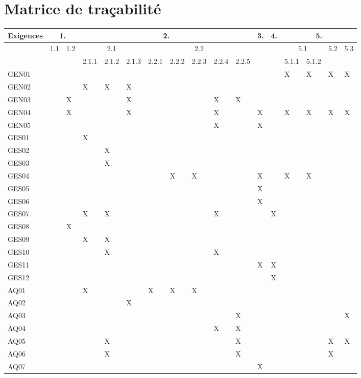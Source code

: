 \chapter{Matrice de traçabilité}
\begin{table}[H]
\hspace{-30px}
\begin{tabular}{|p{}|p{0.67cm}|p{0.67cm}|p{0.67cm}|p{0.67cm}|p{0.67cm}|p{0.67cm}|p{0.67cm}|p{0.67cm}|p{0.67cm}|p{0.67cm}|p{0.67cm}|p{0.67cm}|p{0.67cm}|p{0.67cm}|p{0.67cm}|p{0.67cm}|}
\hline
	Exigences & \multicolumn{2}{c|}{1.} & \multicolumn{8}{c|}{2.} & 3. & 4. & \multicolumn{4}{c|}{5.} \\ 
\hline
	& 1.1 & 1.2 & \multicolumn{3}{c|}{2.1} & \multicolumn{5}{c|}{2.2} & & & \multicolumn{2}{c|}{5.1} & 5.2 & 5.3 \\
\hline
	& & & 2.1.1 & 2.1.2 & 2.1.3 & 2.2.1 & 2.2.2 & 2.2.3 & 2.2.4 & 2.2.5 & & & 5.1.1 & 5.1.2 & & \\
\hline  
	GEN01 & & & & & & & & & & & & & X & X & X & X \\
\hline  
	GEN02\footnotemark {} & & & X & X & X & & & & & & & & & & & \\
\hline  
	GEN03 & & X & & & X & & & & X & X & & & & & & \\
\hline  
	GEN04 & & X & & & X & & & & X & & X & & X & X & X & X \\
\hline  
	GEN05 & & & & & & & & & X & & X & & & & & \\
\hline  
	GES01 & & & X & & & & & & & & & & & & & \\
\hline  
	GES02 & & & & X & & & & & & & & & & & & \\
\hline  
	GES03 & & & & X & & & & & & & & & & & & \\
\hline  
	GES04 & & & & & & & X & X & & & X & & X & X & & \\
\hline  
	GES05 & & & & & & & & & & & X & & & & & \\
\hline  
	GES06 & & & & & & & & & & & X & & & & & \\
\hline  
	GES07 & & & X & X & & & & & X & & & X & & & & \\
\hline  
	GES08 & & X & & & & & & & & & & & & & & \\
\hline  
	GES09 & & & X & X & & & & & & & & & & & & \\
\hline  
	GES10 & & & & X & & & & & X & & & & & & & \\
\hline  
	GES11 & & & & & & & & & & & X & X & & & & \\
\hline  
	GES12 & & & & & & & & & & & & X & & & & \\
\hline  
	AQ01 & & & X & & & X & X & X & & & & & & & & \\
\hline  
	AQ02 & & & & & X & & & & & & & & & & & \\
\hline  
	AQ03 & & & & & & & & & & X & & & & & & X\\	
\hline  
	AQ04 & & & & & & & & & X & X & & & & & & \\	
\hline  
	AQ05 & & & & X & & & & & & X & & & & & X & X\\	
\hline  
	AQ06 & & & & X & & & & & & X & & & & & X & \\	
\hline  
	AQ07 & & & & & & & & & & & X & & & & & \\								


\end{tabular}
\end{table}
